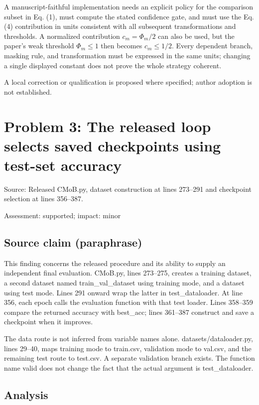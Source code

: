 \documentclass[11pt]{article}
\begin{document}
A manuscript-faithful implementation needs an explicit policy for the comparison subset in Eq. (1), must compute the stated confidence gate, and must use the Eq. (4) contribution in units consistent with all subsequent transformations and thresholds. A normalized contribution \(c_m=\Phi_m/2\) can also be used, but the paper’s weak threshold \(\Phi_m\le1\) then becomes \(c_m\le1/2\). Every dependent branch, masking rule, and transformation must be expressed in the same units; changing a single displayed constant does not prove the whole strategy coherent.

A local correction or qualification is proposed where specified; author adoption is not established.

\section*{Problem 3: The released loop selects saved checkpoints using test-set accuracy}

Source: Released CMoB.py, dataset construction at lines 273–291 and checkpoint selection at lines 356–387.

Assessment: supported; impact: minor

\subsection*{Source claim (paraphrase)}

This finding concerns the released procedure and its ability to supply an independent final evaluation. CMoB.py, lines 273–275, creates a training dataset, a second dataset named train\_val\_dataset using training mode, and a dataset using test mode. Lines 291 onward wrap the latter in test\_dataloader. At line 356, each epoch calls the evaluation function with that test loader. Lines 358–359 compare the returned accuracy with best\_acc; lines 361–387 construct and save a checkpoint when it improves.

The data route is not inferred from variable names alone. datasets/dataloader.py, lines 29–40, maps training mode to train.csv, validation mode to val.csv, and the remaining test route to test.csv. A separate validation branch exists. The function name valid does not change the fact that the actual argument is test\_dataloader.

\subsection*{Analysis}
\end{document}
